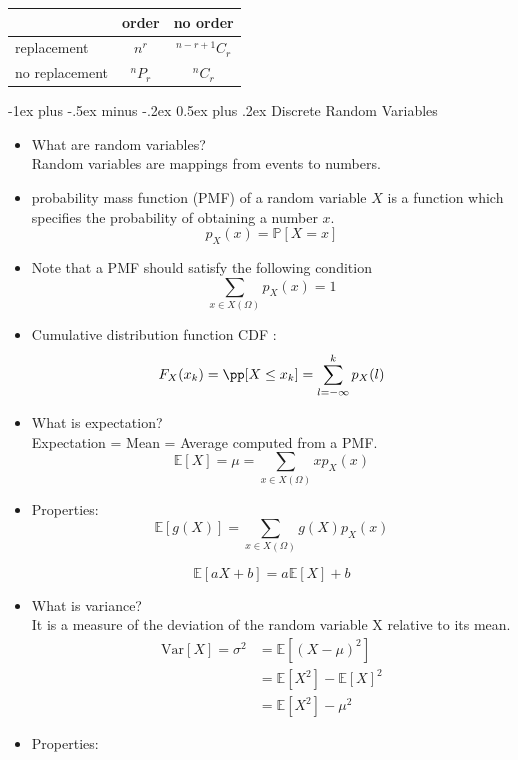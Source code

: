 \documentclass[10pt,landscape]{article}
\makeatletter
\renewcommand{\section}{\@startsection{section}{1}{0mm}%
                                {-1ex plus -.5ex minus -.2ex}%
                                {0.5ex plus .2ex}%
                                {\normalfont\large\bfseries}}
\makeatother
\begin{document}
\begin{multicols*}{3}
\begin{center}
  \begin{tabular}{|l||c|c|}
    \hline
    & order & no order \\
    \hline \hline
    replacement & $n^r$ & ${}^{n-r+1} C_r$ \\
    \hline
    no replacement & ${}^n P_r$ & ${}^n C_r$ \\
    \hline
\end{tabular}  
\end{center}



\section{Discrete Random Variables}
\begin{itemize}
\item What are random variables?\\
Random variables are mappings from events to numbers.
\item  probability mass function (PMF) of a random variable $X$ is a function which specifies the probability of obtaining a number $x$. 
$$p_X(x) = \mathbb{P}[X=x]$$
\item Note that a PMF should satisfy the following condition 
$$\sum_{x\in X(\Omega)} p_X(x) = 1 $$

\item Cumulative distribution function CDF  :
$$ F_X(x_k) = \pp[X \leq x_k] = \sum_{l=-\infty}^k p_X(l) $$


\item What is expectation?\\
Expectation = Mean = Average computed from a PMF.
$$ \mathbb{E}[X] = \mu = \sum_{x \in X(\Omega)}xp_X(x) $$

\item Properties:
$$ \mathbb{E}[g(X)] = \sum_{x \in X(\Omega)}g(X) p_X(x) $$

$$\mathbb{E}[aX+b] =a\mathbb{E}[X]+b $$

\item What is variance?\\
It is a measure of the deviation of the random variable X relative to its mean.
\begin{align*}
\text{Var}[X] = \sigma^2 &= \mathbb{E}[(X- \mu)^2] \\
&=\mathbb{E}[X^2]  - \mathbb{E}[X]^2\\
&=\mathbb{E}[X^2]  - \mu^2
\end{align*}
\item Properties:


\end{itemize}
\end{multicols*}
\end{document}
